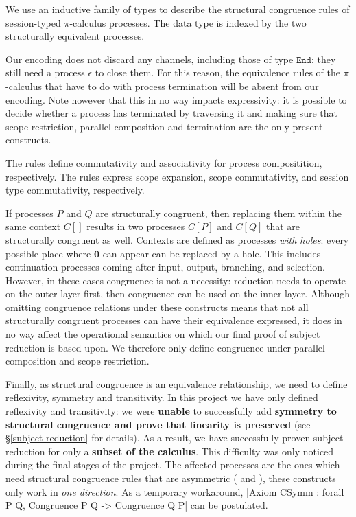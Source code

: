 \documentclass{mproj}
\newcommand{\PO}{\mathbf{0}}
\newcommand{\picalc}{$\pi$-calculus}
\newcommand{\type}{\texttt}
\newcommand{\End}{\type{End}}
\begin{document}
We use an inductive family of types to describe the structural congruence rules of session-typed \picalc{} processes. The data type is indexed by the two structurally equivalent processes.


Our encoding does not discard any channels, including those of type $\End$: they still need a process $\epsilon$ to close them. For this reason, the equivalence rules of the \picalc{} that have to do with process termination will be absent from our encoding. Note however that this in no way impacts expressivity: it is possible to decide whether a process has terminated by traversing it and making sure that scope restriction, parallel composition and termination are the only present constructs.

The  rules define commutativity and associativity for process compositition, respectively. The  rules express scope expansion, scope commutativity, and session type commutativity, respectively.


If processes $P$ and $Q$ are structurally congruent, then replacing them within the same context $C[]$ results in two processes $C[P]$ and $C[Q]$ that are structurally congruent as well. Contexts are defined as processes \emph{with holes}: every possible place where $\PO$ can appear can be replaced by a hole. This includes continuation processes coming after input, output, branching, and selection. However, in these cases congruence is not a necessity: reduction needs to operate on the outer layer first, then congruence can be used on the inner layer. Although omitting congruence relations under these constructs means that not all structurally congruent processes can have their equivalence expressed, it does in no way affect the operational semantics on which our final proof of subject reduction is based upon. We therefore only define congruence under parallel composition and scope restriction.


Finally, as structural congruence is an equivalence relationship, we need to define reflexivity, symmetry and transitivity. In this project we have only defined reflexivity and transitivity: we were \textbf{unable} to successfully add \textbf{symmetry to structural congruence and prove that linearity is preserved} (see \S \ref{subject-reduction} for details). As a result, we have successfully proven subject reduction for only a \textbf{subset of the calculus}. This difficulty was only noticed during the final stages of the project. The affected processes are the ones which need structural congruence rules that are asymmetric ( and ), these constructs only work in \emph{one direction}. As a temporary workaround, \coqe|Axiom CSymm : forall {P Q}, Congruence P Q -> Congruence Q P| can be postulated.
\end{document}
